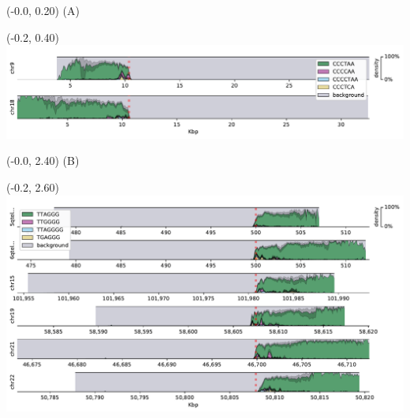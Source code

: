 \documentclass{article}
\begin{document}
\begin{textblock}{13}(-0.0,  0.20) \LARGE{(A)} \end{textblock}
\begin{textblock}{13}(-0.2,  0.40) \includegraphics[width=.7\textwidth,keepaspectratio]{densityplots/HG006-densityplot-p_arm.pdf}   \end{textblock}

\begin{textblock}{13}(-0.0,  2.40) \LARGE{(B)} \end{textblock}
\begin{textblock}{13}(-0.2,  2.60) \includegraphics{densityplots/HG006-densityplot-q_arm.pdf}   \end{textblock}
\end{document}

